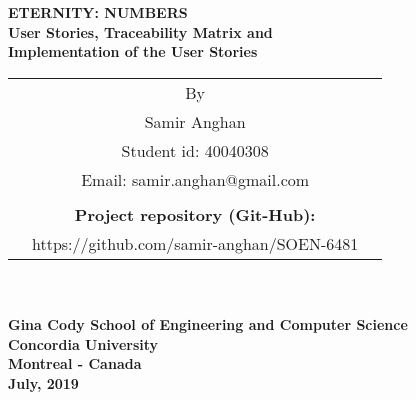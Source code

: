 \thispagestyle{empty}
\begin{center}
\Large \textbf{ ETERNITY: NUMBERS \\User Stories, Traceability Matrix and \\Implementation of the User Stories  \\}
\normalsize
\vspace{84pt}

\large
\begin{tabular}{ccc}
&By&\\
&Samir Anghan&\\
&Student id: 40040308&\\
&Email: samir.anghan@gmail.com&\\ \\
&\textbf{Project repository (Git-Hub):}&\\ &https://github.com/samir-anghan/SOEN-6481&
\end{tabular}\\

\vspace{84pt}
\hspace{5cm} \makebox[6in]{\hrulefill}\\
\large
\textbf{Gina Cody School of Engineering and Computer Science}\\
\textbf{Concordia University} \\
\textbf{Montreal - Canada}\\
\vspace{24pt}
\textbf{July, 2019}
\end{center}
